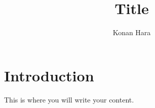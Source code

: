 \documentclass{article}
\title{Title}
\author{Konan Hara}
\begin{document}
 
\maketitle{} 
\section{Introduction} This is where you will write your content. 
\end{document}
